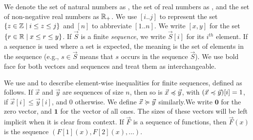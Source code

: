 \documentclass[letterpaper, 10 pt, conference]{ieeeconf}  %
\newcommand{\sa}[1]{\noindent\textcolor{red}{\newline SA: #1}}
\newcommand{\sa}[1]{}
\begin{document}
\noindent
We denote the set of natural numbers as \nats, the set of real numbers as \reals, and 
the set of non-negative real numbers as $\mathbb{R}_+$.
We use $ [i.. j] $ to represent the set $ \{z\in\mathbb{Z} \mid i\le z \le j\} $ and $[n]$ to abbreviate $[1..n]$.  We write  $[x,y]$ for the set $\{r\in\mathbb{R} \mid x\le r\le y\}$.
If $\vec{S}$ is a finite \emph{sequence}, we write $ \vec{S}[i] $ for its $i^{\mathit{th}}$ element.
If a sequence is used where a set is expected, the meaning is the set of elements in the sequence (e.g., $s\in \vec{S}$ means that $s$ occurs in the sequence $\vec{S}$).
We use bold face for both vectors and sequences and treat them as interchangeable. 

We use \vleq and \vgeq to describe element-wise inequalities for finite sequences, defined as follows.  If $\vec{x}$ and $\vec{y}$ are sequences of size $n$, then so is $\vec{x} \preccurlyeq \vec{y}$, with $(\vec{x} \preccurlyeq \vec{y})[i] = 1$, if $\vec{x}[i] \le \vec{y}[i]$, and $0$ otherwise. We define $\vec{x} \succcurlyeq \vec{y}$ similarly.We write $ \mathbf{0} $ for the zero vector, and $ \mathbf{1} $ for the vector of all ones. The sizes of these vectors will be left implicit when it is clear from context. 
If $\vec{F}$ is a sequence of functions, then $\vec{F}(x)$ is the sequence $(F[1](x),F[2](x),\dots)$.
\end{document}
